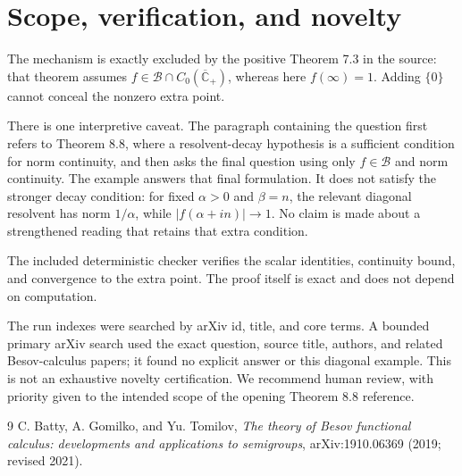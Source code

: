 \documentclass[11pt]{article}
\newcommand{\B}{\mathcal B}
\newcommand{\C}{\mathbb C}
\begin{document}
\section{Scope, verification, and novelty}

The mechanism is exactly excluded by the positive Theorem 7.3 in the source:
that theorem assumes $f\in\B\cap C_0(\overline{\C}_+)$, whereas here
$f(\infty)=1$.  Adding $\{0\}$ cannot conceal the nonzero extra point.

There is one interpretive caveat.  The paragraph containing the question
first refers to Theorem 8.8, where a resolvent-decay hypothesis is a sufficient
condition for norm continuity, and then asks the final question using only
$f\in\B$ and norm continuity.  The example answers that final formulation.
It does not satisfy the stronger decay condition: for fixed $\alpha>0$ and
$\beta=n$, the relevant diagonal resolvent has norm $1/\alpha$, while
$|f(\alpha+in)|\to1$.  No claim is made about a strengthened reading that
retains that extra condition.

The included deterministic checker verifies the scalar identities,
continuity bound, and convergence to the extra point.  The proof itself is
exact and does not depend on computation.

The run indexes were searched by arXiv id, title, and core terms.  A bounded
primary arXiv search used the exact question, source title, authors, and
related Besov-calculus papers; it found no explicit answer or this diagonal
example.  This is not an exhaustive novelty certification.  We recommend
human review, with priority given to the intended scope of the opening
Theorem 8.8 reference.

\begin{thebibliography}{9}
C. Batty, A. Gomilko, and Yu. Tomilov,
\emph{The theory of Besov functional calculus: developments and applications
to semigroups}, arXiv:1910.06369 (2019; revised 2021).
\end{thebibliography}
\end{document}
